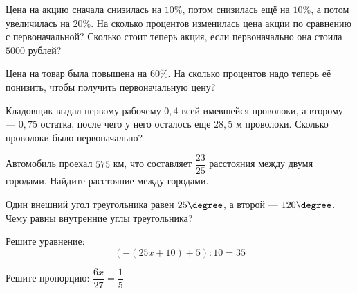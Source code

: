 \begin{exam}
	\begin{listofex}
		\item Цена на акцию сначала снизилась на \(10\%\), потом снизилась ещё на \(10\%\), а потом увеличилась на \(20\%\). На сколько процентов изменилась цена акции по сравнению с первоначальной? Сколько стоит теперь акция, если первоначально она стоила \(5000\) рублей?
		\item Цена на товар была повышена на \( 60\% \). На сколько процентов надо теперь её понизить, чтобы получить первоначальную цену?
		\item Кладовщик выдал первому рабочему \(0,4\) всей имевшейся проволоки, а второму --- \(0,75\) остатка, после чего у него осталось еще \(28,5\) м проволоки. Сколько проволоки было первоначально?
		\item Автомобиль проехал \(575\) км, что составляет \(\dfrac{23}{25}\) расстояния между двумя городами. Найдите расстояние между городами.
		\item Один внешний угол треугольника равен \( 25\degree \), а второй --- \( 120\degree \). Чему равны внутренние углы треугольника?
		\item Решите уравнение: \[ (-(25x+10)+5):10=35\]
		\item Решите пропорцию: \( \dfrac{6x}{27}=\dfrac{1}{5} \)
	\end{listofex}
\end{exam}
